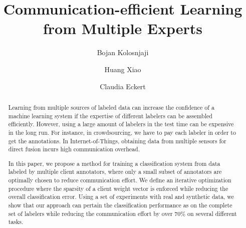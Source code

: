 \documentclass{llncs}
\begin{document}
%
\frontmatter          %
%
%
\mainmatter              %
%
\title{ Communication-efficient Learning from Multiple Experts}
%
%
\author{Bojan  Kolosnjaji \and Huang Xiao 
	\and Claudia Eckert }
%
%
%

\maketitle              %

\begin{abstract}
Learning from multiple sources of labeled data can increase the confidence of a machine learning system if the expertise of different labelers can be assembled efficiently. However, using a large amount of labelers in the test time can be expensive in the long run. For instance, in crowdsourcing, we have to pay each labeler in order to get the annotations. In Internet-of-Things, obtaining data from multiple sensors for direct fusion incurs high communication overhead. 

In this paper, we propose a method for training a classification system from data labeled by multiple client annotators, where only a small subset of annotators are optimally chosen to reduce communication effort. 
We define an iterative optimization procedure where the sparsity of a client weight vector is enforced while reducing the overall classification error. Using a set of experiments with real and synthetic data, we show that our approach can pertain the classification performance as on the complete set of labelers while reducing the communication effort by over 70\% on several different tasks.

\end{abstract}
%
\end{document}
